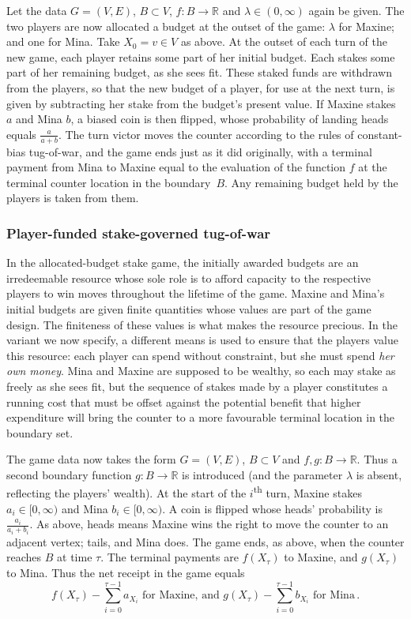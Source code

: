 \documentclass[letterpaper,11pt,oneside,reqno]{amsbook}
\newcommand{\R}{\ensuremath{\mathbb{R}}}
\numberwithin{figure}{chapter}
\theoremstyle{definition}
\theoremstyle{definition}
\theoremstyle{definition}
\theoremstyle{definition}
\theoremstyle{definition}
\begin{document}
Let the data $G=(V,E)$, $B \subset V$, $f:B \to \R$ and $\lambda \in (0,\infty)$ again be given. 
 The two players are now allocated a budget at the outset of the game: $\lambda$ for Maxine; and one for Mina. Take $X_0 = v \in V$ as above.
At the outset of each turn of the new game, each player retains some part of her initial budget. Each stakes some part of her remaining budget, as she sees fit. These staked funds are withdrawn from the players, so that the new budget of a player, for use at the next turn, is given by subtracting her stake from the budget's present value. If Maxine stakes $a$ and Mina $b$,
a biased coin is then flipped, whose probability of landing heads equals $\tfrac{a}{a+b}$. The turn victor moves the counter according to the rules of constant-bias tug-of-war, and the game ends just as it did originally, with a terminal payment from Mina to Maxine equal to the evaluation of the function $f$ at the terminal counter location in the boundary~$B$. Any remaining budget held by the players is taken from them. 


\medskip

\subsubsection{Player-funded stake-governed tug-of-war}\label{s.playerfunded}

 In the allocated-budget stake game, the initially awarded budgets are an irredeemable resource whose sole role is to afford capacity  to the respective players to win moves throughout the lifetime of the game. Maxine and Mina's initial budgets are given finite quantities whose values are part of the game design. The finiteness of these values is what makes the resource precious.
 In the variant we now specify, a different means is used to ensure that the players value this resource: each player can spend without constraint, but she must spend {\em her own money}.
 Mina and Maxine are supposed to be wealthy, so each may stake as freely as she sees fit, but the sequence of stakes made by a player constitutes a running cost that must be offset against 
 the potential benefit that higher expenditure will bring the counter to a more favourable terminal location in the boundary set. 

 

The game data now takes the form  $G=(V,E)$, $B \subset V$ and $f,g:B \to \R$.
Thus a second boundary function $g:B \to \R$ is introduced (and the parameter $\lambda$ is absent, reflecting the players' wealth).
 At the start of the $i$\textsuperscript{th} turn, Maxine stakes $a_i \in [0,\infty)$
and Mina $b_i \in [0,\infty)$. A coin is flipped whose heads' probability is $\tfrac{a_i}{a_i+b_i}$. As above, heads means Maxine wins the right to move the counter to an adjacent vertex; tails, and Mina does. The game ends, as above, when the counter reaches $B$ at time $\tau$. The terminal payments are $f(X_\tau)$ to Maxine, and $g(X_\tau)$ to Mina. 
 Thus the net receipt in the game equals
 \begin{equation}\label{e.netreceipt}
  \textrm{$f(X_\tau) - \sum_{i=0}^{\tau -1} a_{X_i}$ for Maxine, and $g(X_\tau) - \sum_{i=0}^{\tau -1} b_{X_i}$ for Mina} \, .
\end{equation}
\end{document}

